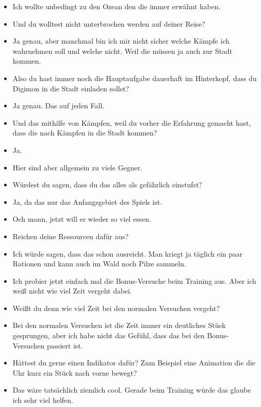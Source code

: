 {\begin{itemize}[]
    \item {} Ich wollte unbedingt zu den Ozean den die immer erwähnt haben.
    \item {} Und du wolltest nicht unterbrochen werden auf deiner Reise?
    \item {} Ja genau, aber manchmal bin ich mir nicht sicher welche Kämpfe ich wahrnehmen soll und welche nicht. Weil die müssen ja auch zur Stadt kommen.
    \item {} Also du hast immer noch die Hauptaufgabe dauerhaft im Hinterkopf, dass du Digimon in die Stadt einladen sollst?
    \item {} Ja genau. Das auf jeden Fall.
    \item {} Und das mithilfe von Kämpfen, weil du vorher die Erfahrung gemacht hast, dass die nach Kämpfen in die Stadt kommen?
    \item {} Ja. 
    \item {} Hier sind aber allgemein zu viele Gegner.
    \item {} Würdest du sagen, dass du das alles als gefährlich einstufst?
    \item {} Ja, da das nur das Anfangsgebiet des Spiels ist.
    \item {} Och mann, jetzt will er wieder so viel essen.
    \item {} Reichen deine Ressourcen dafür aus?
    \item {} Ich würde sagen, dass das schon ausreicht. Man kriegt ja täglich ein paar Rationen und kann auch im Wald noch Pilze sammeln. 
    \item {} Ich probier jetzt einfach mal die Bonus-Versuche beim Training aus. Aber ich weiß nicht wie viel Zeit vergeht dabei.
    \item {} Weißt du denn wie viel Zeit bei den normalen Versuchen vergeht?
    \item {} Bei den normalen Versuchen ist die Zeit immer ein deutliches Stück gesprungen, aber ich habe nicht das Gefühl, dass das bei den Bonus-Versuchen passiert ist.
    \item {} Hättest du gerne einen Indikator dafür? Zum Beispiel eine Animation die die Uhr kurz ein Stück nach vorne bewegt?
    \item {} Das wäre tatsächlich ziemlich cool. Gerade beim Training würde das glaube ich sehr viel helfen. 

\end{itemize}}
